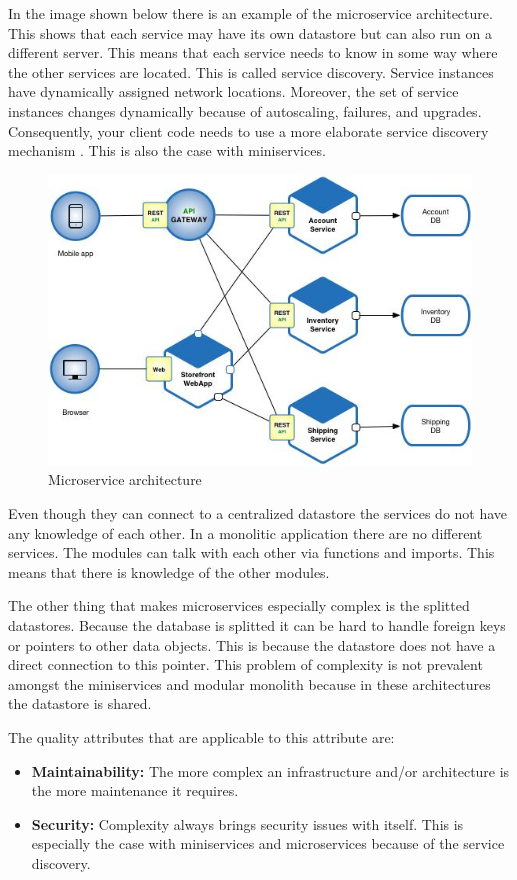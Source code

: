 In the image shown below there is an example of the microservice architecture. This shows that each service may have its own datastore but can also run on a different server. This means that each service needs to know in some way where the other services are located. This is called service discovery. Service instances have dynamically assigned network locations. Moreover, the set of service instances changes dynamically because of autoscaling, failures, and upgrades. Consequently, your client code needs to use a more elaborate service discovery mechanism \cite{serviceDiscovery}. This is also the case with miniservices.

\begin{figure}[H]
	\includegraphics[width=\linewidth]{microservice-architecture.png}
	\caption{Microservice architecture}
\end{figure}

Even though they can connect to a centralized datastore the services do not have any knowledge of each other. In a monolitic application there are no different services. The modules can talk with each other via functions and imports. This means that there is knowledge of the other modules.

The other thing that makes microservices especially complex is the splitted datastores. Because the database is splitted it can be hard to handle foreign keys or pointers to other data objects. This is because the datastore does not have a direct connection to this pointer. This problem of complexity is not prevalent amongst the miniservices and modular monolith because in these architectures the datastore is shared.

The quality attributes that are applicable to this attribute are:
\begin{itemize}
        \item \textbf{Maintainability:} The more complex an infrastructure and/or architecture is the more maintenance it requires.
        \item \textbf{Security:} Complexity always brings security issues with itself. This is especially the case with miniservices and microservices because of the service discovery.
\end{itemize}

